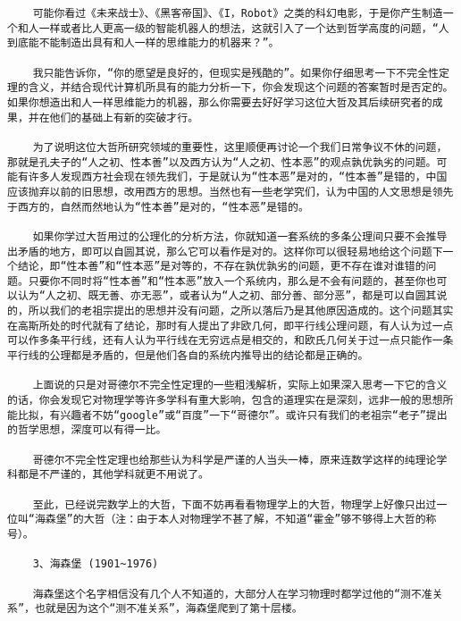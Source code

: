 \begin{verbatim}
    可能你看过《未来战士》、《黑客帝国》、《I，Robot》之类的科幻电影，于是你产生制造一个和人一样或者比人更高一级的智能机器人的想法，这就引入了一个达到哲学高度的问题，“人到底能不能制造出具有和人一样的思维能力的机器来？”。

    我只能告诉你，“你的愿望是良好的，但现实是残酷的”。如果你仔细思考一下不完全性定理的含义，并结合现代计算机所具有的能力分析一下，你会发现这个问题的答案暂时是否定的。如果你想造出和人一样思维能力的机器，那么你需要去好好学习这位大哲及其后续研究者的成果，并在他们的基础上有新的突破才行。

    为了说明这位大哲所研究领域的重要性，这里顺便再讨论一个我们日常争议不休的问题，那就是孔夫子的“人之初、性本善”以及西方认为“人之初、性本恶”的观点孰优孰劣的问题。可能有许多人发现西方社会现在领先我们，于是就认为“性本恶”是对的，“性本善”是错的，中国应该抛弃以前的旧思想，改用西方的思想。当然也有一些老学究们，认为中国的人文思想是领先于西方的，自然而然地认为“性本善”是对的，“性本恶”是错的。

    如果你学过大哲用过的公理化的分析方法，你就知道一套系统的多条公理间只要不会推导出矛盾的地方，即可以自圆其说，那么它可以看作是对的。这样你可以很轻易地给这个问题下一个结论，即“性本善”和“性本恶”是对等的，不存在孰优孰劣的问题，更不存在谁对谁错的问题。只要你不同时将“性本善”和“性本恶”放入一个系统内，那么是不会有问题的，甚至你也可以认为“人之初、既无善、亦无恶”，或者认为“人之初、部分善、部分恶”，都是可以自圆其说的，所以我们的老祖宗提出的思想并没有问题，之所以落后乃是其他原因造成的。这个问题其实在高斯所处的时代就有了结论，那时有人提出了非欧几何，即平行线公理问题，有人认为过一点可以作多条平行线，还有人认为平行线在无穷远点是相交的，和欧氏几何关于过一点只能作一条平行线的公理都是矛盾的，但是他们各自的系统内推导出的结论都是正确的。

    上面说的只是对哥德尔不完全性定理的一些粗浅解析，实际上如果深入思考一下它的含义的话，你会发现它对物理学等许多学科有重大影响，包含的道理实在是深刻，远非一般的思想所能比拟，有兴趣者不妨“google”或“百度”一下“哥德尔”。或许只有我们的老祖宗“老子”提出的哲学思想，深度可以有得一比。

    哥德尔不完全性定理也给那些认为科学是严谨的人当头一棒，原来连数学这样的纯理论学科都是不严谨的，其他学科就更不用说了。

    至此，已经说完数学上的大哲，下面不妨再看看物理学上的大哲，物理学上好像只出过一位叫“海森堡”的大哲（注：由于本人对物理学不甚了解，不知道“霍金”够不够得上大哲的称号）。

    3、海森堡 (1901~1976)

    海森堡这个名字相信没有几个人不知道的，大部分人在学习物理时都学过他的“测不准关系”，也就是因为这个“测不准关系”，海森堡爬到了第十层楼。


\end{verbatim}
